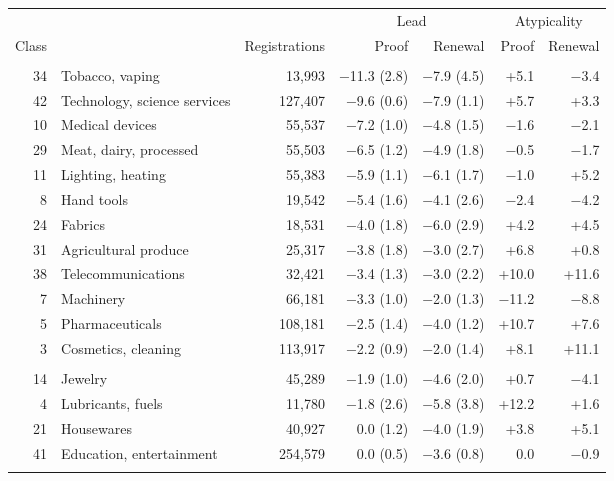 {\small\begin{longtable}{r>{\raggedright\arraybackslash}p{3.7cm}rrrrr}
\toprule & & & \multicolumn{2}{c}{Lead} & \multicolumn{2}{c}{Atypicality} \\ \cmidrule(lr){4-5}\cmidrule(l){6-7} Class & & Registrations & Proof & Renewal & Proof & Renewal \\ \midrule \endhead
\addlinespace\multicolumn{7}{l}{\emph{Lead: penalty persists}} \\
34 & Tobacco, vaping & 13,993 & $-$11.3 (2.8) & $-$7.9 (4.5) & +5.1 & $-$3.4 \\
42 & Technology, science services & 127,407 & $-$9.6 (0.6) & $-$7.9 (1.1) & +5.7 & +3.3 \\
10 & Medical devices & 55,537 & $-$7.2 (1.0) & $-$4.8 (1.5) & $-$1.6 & $-$2.1 \\
29 & Meat, dairy, processed & 55,503 & $-$6.5 (1.2) & $-$4.9 (1.8) & $-$0.5 & $-$1.7 \\
11 & Lighting, heating & 55,383 & $-$5.9 (1.1) & $-$6.1 (1.7) & $-$1.0 & +5.2 \\
8 & Hand tools & 19,542 & $-$5.4 (1.6) & $-$4.1 (2.6) & $-$2.4 & $-$4.2 \\
24 & Fabrics & 18,531 & $-$4.0 (1.8) & $-$6.0 (2.9) & +4.2 & +4.5 \\
31 & Agricultural produce & 25,317 & $-$3.8 (1.8) & $-$3.0 (2.7) & +6.8 & +0.8 \\
38 & Telecommunications & 32,421 & $-$3.4 (1.3) & $-$3.0 (2.2) & +10.0 & +11.6 \\
7 & Machinery & 66,181 & $-$3.3 (1.0) & $-$2.0 (1.3) & $-$11.2 & $-$8.8 \\
5 & Pharmaceuticals & 108,181 & $-$2.5 (1.4) & $-$4.0 (1.2) & +10.7 & +7.6 \\
3 & Cosmetics, cleaning & 113,917 & $-$2.2 (0.9) & $-$2.0 (1.4) & +8.1 & +11.1 \\
\addlinespace\multicolumn{7}{l}{\emph{Lead: penalty appears late}} \\
14 & Jewelry & 45,289 & $-$1.9 (1.0) & $-$4.6 (2.0) & +0.7 & $-$4.1 \\
4 & Lubricants, fuels & 11,780 & $-$1.8 (2.6) & $-$5.8 (3.8) & +12.2 & +1.6 \\
21 & Housewares & 40,927 & 0.0 (1.2) & $-$4.0 (1.9) & +3.8 & +5.1 \\
41 & Education, entertainment & 254,579 & 0.0 (0.5) & $-$3.6 (0.8) & 0.0 & $-$0.9 \\
\addlinespace\multicolumn{7}{l}{\emph{Lead: penalty fades}} \\

\end{longtable}}
